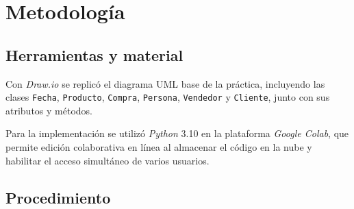 \documentclass[11pt]{article}
\begin{document}
\section{Metodología} \label{sec:metodologia}


\subsection{Herramientas y material}
Con \textit{Draw.io} se replicó el diagrama UML base de la práctica, incluyendo las clases \texttt{Fecha}, \texttt{Producto}, \texttt{Compra}, \texttt{Persona}, \texttt{Vendedor} y \texttt{Cliente}, junto con sus atributos y métodos.  

Para la implementación se utilizó \textit{Python} 3.10 en la plataforma \textit{Google Colab}, que permite edición colaborativa en línea al almacenar el código en la nube y habilitar el acceso simultáneo de varios usuarios.



\subsection{Procedimiento}
\end{document}

